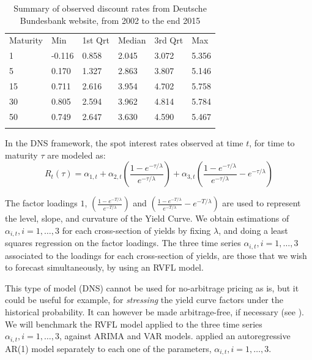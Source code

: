 \begin{table}
\begin{center}
\caption{Summary of observed discount rates from Deutsche Bundesbank website, from 2002 to the end 2015}
\label{tab:summary_db_zeros}       %
\begin{tabular}{llllll}
\hline\noalign{\smallskip}
Maturity & Min & 1st Qrt  & Median  & 3rd Qrt  & Max  \\
\noalign{\smallskip}\hline\noalign{\smallskip}
  1 & -0.116 & 0.858 & 2.045 & 3.072 & 5.356 \\
  5 & 0.170 & 1.327 & 2.863 & 3.807 & 5.146\\
  15 & 0.711 & 2.616 & 3.954 & 4.702 & 5.758\\
  30 & 0.805 & 2.594 & 3.962 & 4.814 & 5.784\\
  50 & 0.749 & 2.647 & 3.630 & 4.590 & 5.467\\
\noalign{\smallskip}\hline
\end{tabular}
\end{center}
\end{table}

In the DNS framework, the spot interest rates observed at time $t$, for time to maturity $\tau$ are modeled as:
\begin{equation}
R_t(\tau) = \alpha_{1, t} + \alpha_{2, t}\left(\frac{1-e^{-\tau/\lambda}}{e^{-\tau/\lambda}}\right) + \alpha_{3, t}\left(\frac{1-e^{-\tau/\lambda}}{e^{-\tau/\lambda}} - e^{-\tau/\lambda}\right)
\end{equation}

\medskip

The factor loadings $1$, $\left(\frac{1-e^{-T/\lambda}}{e^{-T/\lambda}}\right)$ and $\left(\frac{1-e^{-T/\lambda}}{e^{-T/\lambda}} - e^{-T/\lambda}\right)$ are used to represent the level, slope, and curvature of the Yield Curve. We obtain estimations of $\alpha_{i, t}, i = 1, \ldots, 3$ for each cross-section of yields by fixing $\lambda$, and doing a least squares regression on the factor loadings. The three time series $\alpha_{i, t}, i = 1, \ldots, 3$ associated to the loadings for each cross-section of yields, are those that we wish to forecast simultaneously, by using an RVFL model.

\medskip

This type of model (DNS) cannot be used for no-arbitrage pricing as is, but it could be useful for example, for \textit{stressing} the yield curve factors under the historical probability. It can however be made arbitrage-free, if necessary (see \cite{diebold2013yield}). We will benchmark the RVFL model applied to the three time series $\alpha_{i, t}, i = 1, \ldots, 3$, against ARIMA and VAR models. \cite{diebold2006forecasting} applied an autoregressive AR(1) model separately to each one of the parameters, $\alpha_{i, t}, i = 1, \ldots, 3$. 

